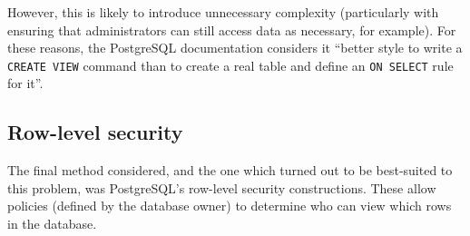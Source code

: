 \documentclass{report}
\begin{document}
However, this is likely to introduce unnecessary complexity (particularly with ensuring that administrators can still access data as necessary, for example). For these reasons, the PostgreSQL documentation considers it ``better style to write a \texttt{CREATE VIEW} command than to create a real table and define an \texttt{ON SELECT} rule for it''\cite{postgres-CREATE_RULE}.

\subsection{Row-level security}
The final method considered, and the one which turned out to be best-suited to this problem, was PostgreSQL's row-level security constructions. These allow policies (defined by the database owner) to determine who can view which rows in the database.
\end{document}
